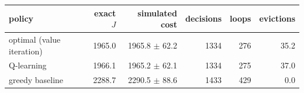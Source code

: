 \begin{tabular}{lrrrrr}
\toprule
policy & exact $J$ & simulated cost & decisions & loops & evictions \\
\midrule
optimal (value iteration) & 1965.0 & 1965.8 $\pm$ 62.2 & 1334 & 276 & 35.2 \\
Q-learning & 1966.1 & 1965.2 $\pm$ 62.1 & 1334 & 275 & 37.0 \\
greedy baseline & 2288.7 & 2290.5 $\pm$ 88.6 & 1433 & 429 & 0.0 \\
\bottomrule
\end{tabular}

